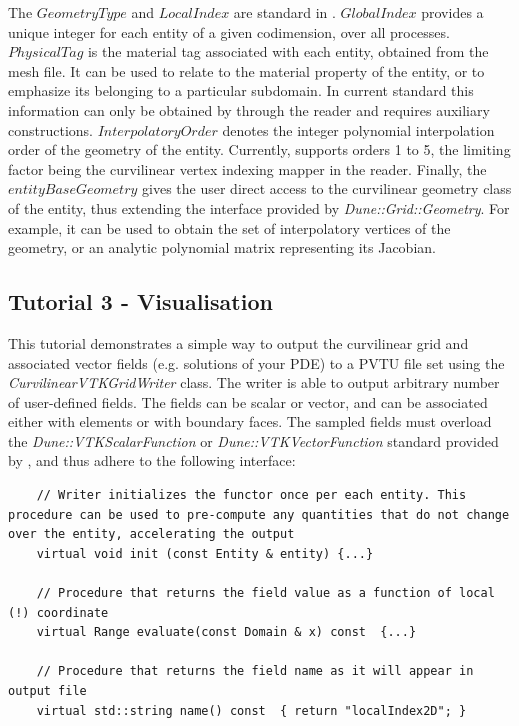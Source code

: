 \noindent
The $GeometryType$ and $LocalIndex$ are standard in \dune{}. $GlobalIndex$ provides a unique integer for each entity of a given codimension, over all processes. $PhysicalTag$ is the material tag associated with each entity, obtained from the mesh file. It can be used to relate to the material property of the entity, or to emphasize its belonging to a particular subdomain. In current \dunegrid{} standard this information can only be obtained by through the reader and requires auxiliary constructions. $InterpolatoryOrder$ denotes the integer polynomial interpolation order of the geometry of the entity. Currently, \curvgrid{} supports orders 1 to 5, the limiting factor being the curvilinear vertex indexing mapper in the reader. Finally, the $entityBaseGeometry$ gives the user direct access to the curvilinear geometry class of the entity, thus extending the interface provided by \textit{Dune::Grid::Geometry}. For example, it can be used to obtain the set of interpolatory vertices of the geometry, or an analytic polynomial matrix representing its Jacobian. \\






\subsection{Tutorial 3 - Visualisation}
\label{usage-howto-tutorial-visualisation}

This tutorial demonstrates a simple way to output the curvilinear grid and associated vector fields (e.g. solutions of your PDE) to a PVTU file set using the \textit{CurvilinearVTKGridWriter} class. The writer is able to output arbitrary number of user-defined fields. The fields can be scalar or vector, and can be associated either with elements or with boundary faces. The sampled fields must overload the \textit{Dune::VTKScalarFunction} or \textit{Dune::VTKVectorFunction} standard provided by \curvgrid{}, and thus adhere to the following interface: \\

\begin{mybox}
\begin{lstlisting}
    // Writer initializes the functor once per each entity. This procedure can be used to pre-compute any quantities that do not change over the entity, accelerating the output
    virtual void init (const Entity & entity) {...}

    // Procedure that returns the field value as a function of local (!) coordinate
    virtual Range evaluate(const Domain & x) const  {...}

    // Procedure that returns the field name as it will appear in output file
    virtual std::string name() const  { return "localIndex2D"; }
\end{lstlisting}
\end{mybox}

